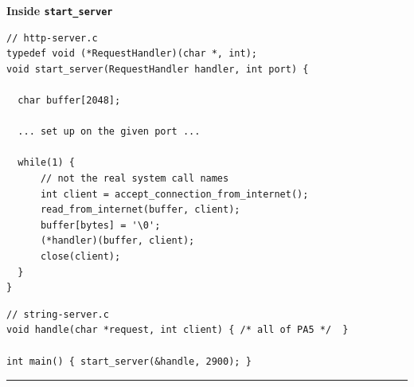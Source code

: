 \documentclass[oneside, landscape]{article}
\begin{document}
\small


\begin{minipage}[t]{0.45\textwidth}

\textbf{Inside \texttt{start\_server}}

\begin{lstlisting}[frame=single, numbers=none, basicstyle=\ttfamily\footnotesize, language={}, linewidth=35em]
// http-server.c
typedef void (*RequestHandler)(char *, int);
void start_server(RequestHandler handler, int port) {

  char buffer[2048];

  ... set up on the given port ...

  while(1) {
      // not the real system call names
      int client = accept_connection_from_internet();
      read_from_internet(buffer, client);
      buffer[bytes] = '\0';
      (*handler)(buffer, client);
      close(client);
  }
}
\end{lstlisting}

\begin{lstlisting}[frame=single, basicstyle=\ttfamily\footnotesize, numbers=none, linewidth=35em]
// string-server.c
void handle(char *request, int client) { /* all of PA5 */  }

int main() { start_server(&handle, 2900); }
\end{lstlisting}

\end{minipage}
\hfill
\begin{minipage}[t]{0.50\textwidth}

\vspace{20em}

\end{minipage}

\vspace{1em}
\hrule
\vspace{1em}
\end{document}
